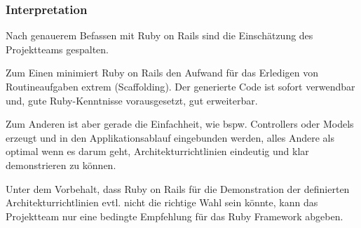 \subsubsection*{Interpretation}
Nach genauerem Befassen mit Ruby on Rails sind die Einschätzung des Projektteams gespalten.

Zum Einen minimiert Ruby on Rails den Aufwand für das Erledigen von Routineaufgaben extrem (\gls{Scaffolding}). Der generierte Code ist sofort verwendbar und, gute Ruby-Kenntnisse vorausgesetzt, gut erweiterbar.

Zum Anderen ist aber gerade die Einfachheit, wie bspw. Controllers oder Models erzeugt und in den Applikationsablauf eingebunden werden, alles Andere als optimal wenn es darum geht, Architekturrichtlinien eindeutig und klar demonstrieren zu können.

Unter dem Vorbehalt, dass Ruby on Rails für die Demonstration der definierten Architekturrichtlinien evtl. nicht die richtige Wahl sein könnte, kann das Projektteam nur eine bedingte Empfehlung für das Ruby Framework abgeben.
